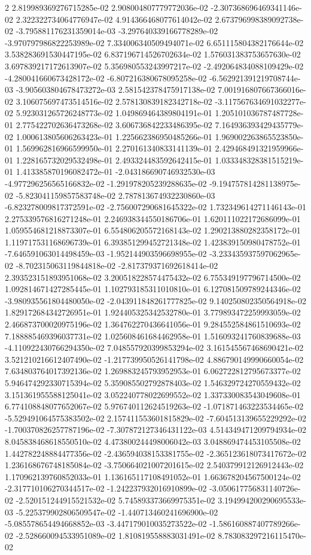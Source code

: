 2	2.819989369276715285e-02	2.908004807779772036e-02	-2.307368696469341146e-02	2.322322734064776947e-02	4.914366468077614042e-02	2.673796998389092738e-02	-3.795881176231359014e-03	-3.297640339166778289e-02	-3.970797986822253989e-02	7.334006340509494071e-02	6.651115804382176644e-02	3.538283691530447195e-02	6.837196714526702634e-02	1.576031383753657630e-02	3.697839217172613907e-02	5.356980553243997217e-02	-2.492064834088109429e-02	-4.280041660673428172e-02	-6.807216380678095258e-02	-6.562921391219708744e-03	-3.905603804678473272e-03	2.581542378475917138e-02	7.001916807667366016e-02	3.106075697473514516e-02	2.578130839182342718e-02	-3.117567634691032277e-02	5.923031265726248773e-02	1.049869464389804191e-01	1.205101036787487728e-01	2.775422702636473268e-02	3.606736842233486395e-02	7.164936393429435779e-02	1.000613805606263423e-01	1.225662386950485266e-01	1.969002263865523850e-01	1.569962816966599950e-01	2.270161340833141139e-01	2.429468491321959966e-01	1.228165732029532498e-01	2.493324483592642415e-01	1.033348328381515219e-01	1.413385870196082472e-01	-2.043186690746932530e-03	-4.977296256565166832e-02	-1.291978205239288635e-02	-9.194757814281138975e-02	-5.823041159857583748e-02	2.787813674932230860e-03	-6.823278009817372591e-02	-2.756007290681645322e-02	1.732349614271146143e-01	2.275339576816271248e-01	2.246938344550186706e-01	1.620111022172686099e-01	1.059554681218873307e-01	6.554806205572168143e-02	1.290213880282358172e-01	1.119717531168696739e-01	6.393851299452721348e-02	1.423839150980478752e-01	-7.646591063014498459e-03	-1.952144903596698955e-02	-3.233435937597062965e-02	-8.702315063119844818e-02	-2.817379371692618414e-02	2.393523151893951068e-02	3.200518228574475432e-02	6.755349197796714500e-02	1.092814671427285445e-01	1.102793185311010810e-01	6.127081509789244346e-02	-3.980935561804480050e-02	-2.043911848261777825e-02	9.140250802350564918e-02	1.829172684342726951e-01	1.924405325342532780e-01	3.779893472259993059e-02	2.466873700020975196e-02	1.364762270436641056e-01	9.284552584861510693e-02	7.188885469396037731e-02	1.025608461684462958e-01	1.516093241760839688e-03	-4.110922430766294350e-02	7.048557920399853294e-02	3.161545567468690421e-02	3.521210216612407490e-02	-1.217739950526141798e-02	4.886790149990660054e-02	7.634803764017392136e-02	1.269883245793952953e-01	6.062722812795673377e-02	5.946474292330715394e-02	5.359085502792878403e-02	1.546329724270559432e-02	3.151361955588125041e-02	3.052240778022699552e-02	1.337330083543049608e-01	6.774108848077652067e-02	5.976740112624519263e-02	-1.071871463223534465e-02	-5.529491064575383502e-02	2.157411553601815829e-02	-7.604513139655229292e-02	-1.700370826257787196e-02	-7.307872127346431122e-03	4.514349471209794934e-02	8.045838468618550510e-02	4.473800244498006042e-03	3.048869474453105508e-02	1.442782248884477356e-02	-2.436594038153381755e-02	-2.365123618073417672e-02	1.236168676748185084e-02	-3.750664021007201615e-02	2.540379912126912443e-02	1.170962139760852033e-01	1.136165117108491052e-01	1.663678204567500124e-02	-2.317710106270344517e-02	-1.242237932016910899e-02	-3.050617756831140726e-02	-2.520151244915521532e-02	5.745893373669975351e-02	3.194994200290695533e-03	-5.225379902806509547e-02	-1.440713460241696900e-02	-5.085578654494668852e-03	-3.447179010035273522e-02	-1.586160887407789266e-02	-2.528660094533951089e-02	1.810819558883031491e-02	8.783083297216115470e-02
